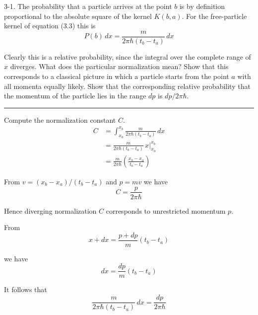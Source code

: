 \documentclass[12pt]{article}
\begin{document}
3-1.
The probability that a particle arrives at the point $b$
is by definition proportional to the absolute square of the kernel
$K(b,a)$.
For the free-particle kernel of equation (3.3) this is
\begin{equation*}
P(b)\,dx=\frac{m}{2\pi\hbar(t_b-t_a)}\,dx
\tag{3.6}
\end{equation*}

Clearly this is a relative probability, since the integral over the
complete range of $x$ diverges.
What does the particular normalization mean?
Show that this corresponds to a classical picture in which a particle
starts from the point $a$ with all momenta equally likely.
Show that the corresponding relative probability that the momentum
of the particle lies in the range $dp$ is $dp/2\pi\hbar$.

\bigskip
\hrule

\bigskip
Compute the normalization constant $C$.
\begin{align*}
C&=\int_{x_a}^{x_b}\frac{m}{2\pi\hbar(t_b-t_a)}\,dx
\\[1ex]
&=\frac{m}{2\pi\hbar(t_b-t_a)}\,x\big|_{x_a}^{x_b}
\\[1ex]
&=\frac{m}{2\pi\hbar}\left(\frac{x_b-x_a}{t_b-t_a}\right)
\end{align*}

From $v=(x_b-x_a)/(t_b-t_a)$ and $p=mv$ we have
\begin{equation*}
C=\frac{p}{2\pi\hbar}
\end{equation*}

\noindent
Hence diverging normalization $C$ corresponds to unrestricted momentum $p$.

\bigskip
\noindent
From
\begin{equation*}
x+dx=\frac{p+dp}{m}(t_b-t_a)
\end{equation*}

\noindent
we have
\begin{equation*}
dx=\frac{dp}{m}(t_b-t_a)
\end{equation*}

\noindent
It follows that
\begin{equation*}
\frac{m}{2\pi\hbar(t_b-t_a)}\,dx=\frac{dp}{2\pi\hbar}
\end{equation*}
\end{document}
